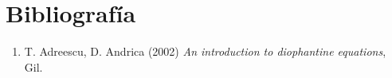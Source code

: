 \section{Bibliografía}

{\small \begin{enumerate}
	\item T. Adreescu, D. Andrica (2002) \textit{An introduction to diophantine equations}, Gil.

	
\end{enumerate}}